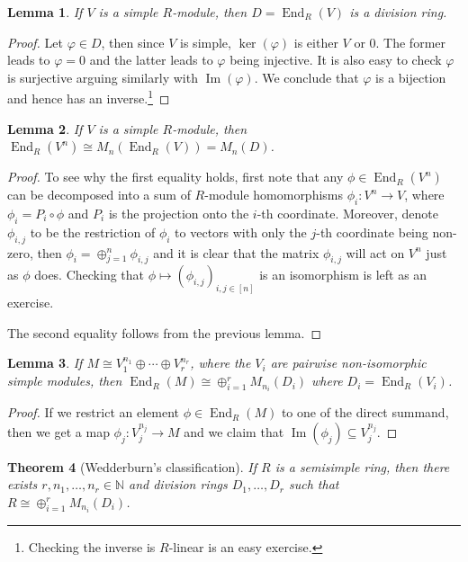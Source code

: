 \documentclass{tufte-handout} %
\newtheorem{thm}{Theorem}
\newtheorem{lem}[thm]{Lemma}
\theoremstyle{definition}
\theoremstyle{remark}
\newcommand{\N}{\mathbb{N}}
\DeclareMathOperator{\im}{Im}
\DeclareMathOperator{\End}{End}
\begin{document}
\begin{lem}\label{endisdivring}
	If $V$ is a simple $R$-module, then $D = \End_R(V)$ is a division ring.
\end{lem}
\begin{proof}
	Let $\varphi \in D$, then since $V$ is simple, $\ker(\varphi)$ is either $V$ or $0$. The former leads to $\varphi = 0$ and the latter leads to $\varphi$ being injective. It is also easy to check $\varphi$ is surjective arguing similarly with $\im(\varphi)$. We conclude that $\varphi$ is a bijection and hence has an inverse.\footnote{Checking the inverse is $R$-linear is an easy exercise.}
\end{proof}
\begin{lem}
	If $V$ is a simple $R$-module, then $\End_R(V^n) \cong M_n(\End_R(V)) = M_n(D)$.
\end{lem}
\begin{proof}
	To see why the first equality holds, first note that any $\phi \in \End_R(V^n)$ can be decomposed into a sum of $R$-module homomorphisms $\phi_i: V^n \rightarrow V$, where $\phi_i = P_i\circ \phi$ and $P_i$ is the projection onto the $i$-th coordinate. Moreover, denote $\phi_{i,j}$ to be the restriction of $\phi_i$ to vectors with only the $j$-th coordinate being non-zero, then $\phi_i = \oplus_{j=1}^n \phi_{i,j}$ and it is clear that the matrix $\phi_{i,j}$ will act on $V^n$ just as $\phi$ does. Checking that $\phi\mapsto (\phi_{i,j})_{i, j \in [n]}$ is an isomorphism is left as an exercise.
	
	The second equality follows from the previous lemma.
\end{proof}
\begin{lem}\label{lem4wedd}
	If $M \cong V_1^{n_1} \oplus \cdots \oplus V_r^{n_r}$, where the $V_i$ are pairwise non-isomorphic simple modules, then $\End_R(M) \cong \oplus_{i=1}^r M_{n_i}(D_i)$ where $D_i = \End_R(V_i)$.
\end{lem}
\begin{proof}
	If we restrict an element $\phi \in \End_R(M)$ to one of the direct summand, then we get a map $\phi_j: V_j^{n_j} \rightarrow M$ and we claim that $\im(\phi_j) \subseteq V_j^{n_j}$. %
\end{proof}
\begin{thm}[Wedderburn's classification]\label{wedclass}
	If $R$ is a semisimple ring, then there exists $r, n_1, \dots, n_r \in \N$ and division rings $D_1, \dots, D_r$ such that $R \cong \oplus_{i=1}^r M_{n_i}(D_i)$.
\end{thm}
\end{document}
